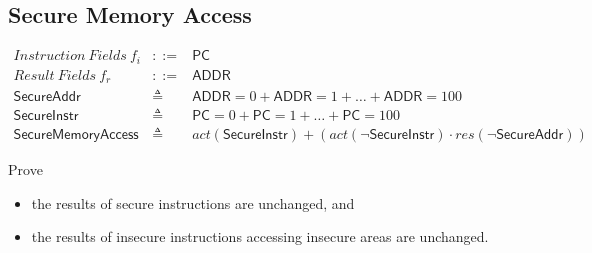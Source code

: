 \documentclass[12pt, letterpaper]{article}
\begin{document}
 


\subsection{Secure Memory Access}
 \[
 \begin{array}{rcl}
   \mathit{Instruction\ Fields}\ f_i &::=& \mathsf{PC} \\
   \mathit{Result\ Fields}\ f_r &::=& \mathsf{ADDR} \\
   \mathsf{SecureAddr} &\triangleq& \mathsf{ADDR} = 0 + \mathsf{ADDR} = 1 + \ldots + \mathsf{ADDR} = 100 \\
   \mathsf{SecureInstr} &\triangleq& \mathsf{PC} = 0 + \mathsf{PC} = 1 + \ldots + \mathsf{PC} = 100 \\
   \mathsf{SecureMemoryAccess} &\triangleq&
     \mathit{act}(\mathsf{SecureInstr}) +
     (\mathit{act}(\neg\mathsf{SecureInstr}) \cdot
      \mathit{res}(\neg\mathsf{SecureAddr}))
      
 \end{array}
 \]

 Prove
 \begin{itemize}
     \item the results of secure instructions are unchanged, and
     \item the results of insecure instructions accessing insecure areas are unchanged.
 \end{itemize}
\end{document}

